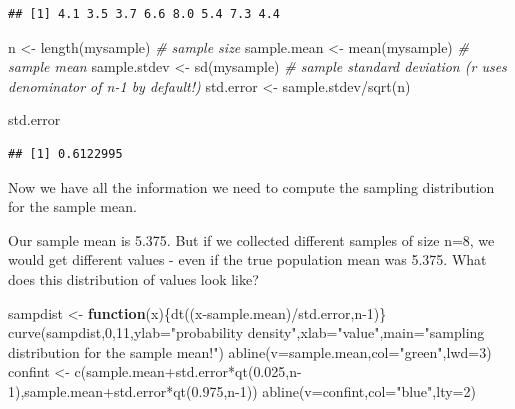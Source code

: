 \documentclass[
]{article}
\newenvironment{Shaded}{\begin{snugshade}}{\end{snugshade}}
\newcommand{\AttributeTok}[1]{\textcolor[rgb]{0.77,0.63,0.00}{#1}}
\newcommand{\CommentTok}[1]{\textcolor[rgb]{0.56,0.35,0.01}{\textit{#1}}}
\newcommand{\ControlFlowTok}[1]{\textcolor[rgb]{0.13,0.29,0.53}{\textbf{#1}}}
\newcommand{\DecValTok}[1]{\textcolor[rgb]{0.00,0.00,0.81}{#1}}
\newcommand{\FloatTok}[1]{\textcolor[rgb]{0.00,0.00,0.81}{#1}}
\newcommand{\FunctionTok}[1]{\textcolor[rgb]{0.00,0.00,0.00}{#1}}
\newcommand{\NormalTok}[1]{#1}
\newcommand{\OtherTok}[1]{\textcolor[rgb]{0.56,0.35,0.01}{#1}}
\newcommand{\SpecialCharTok}[1]{\textcolor[rgb]{0.00,0.00,0.00}{#1}}
\newcommand{\StringTok}[1]{\textcolor[rgb]{0.31,0.60,0.02}{#1}}
\begin{document}
\begin{verbatim}
## [1] 4.1 3.5 3.7 6.6 8.0 5.4 7.3 4.4
\end{verbatim}

\begin{Shaded}
\begin{Highlighting}[]
\NormalTok{n }\OtherTok{\textless{}{-}} \FunctionTok{length}\NormalTok{(mysample)    }\CommentTok{\# sample size}
\NormalTok{sample.mean }\OtherTok{\textless{}{-}} \FunctionTok{mean}\NormalTok{(mysample)  }\CommentTok{\# sample mean}
\NormalTok{sample.stdev }\OtherTok{\textless{}{-}} \FunctionTok{sd}\NormalTok{(mysample)   }\CommentTok{\# sample standard deviation (r uses denominator of n{-}1 by default!)}
\NormalTok{std.error }\OtherTok{\textless{}{-}}\NormalTok{ sample.stdev}\SpecialCharTok{/}\FunctionTok{sqrt}\NormalTok{(n) }

\NormalTok{std.error }
\end{Highlighting}
\end{Shaded}

\begin{verbatim}
## [1] 0.6122995
\end{verbatim}

Now we have all the information we need to compute the sampling
distribution for the sample mean.

Our sample mean is 5.375. But if we collected different samples of size
n=8, we would get different values - even if the true population mean
was 5.375. What does this distribution of values look like?

\begin{Shaded}
\begin{Highlighting}[]
\NormalTok{sampdist }\OtherTok{\textless{}{-}} \ControlFlowTok{function}\NormalTok{(x)\{}\FunctionTok{dt}\NormalTok{((x}\SpecialCharTok{{-}}\NormalTok{sample.mean)}\SpecialCharTok{/}\NormalTok{std.error,n}\DecValTok{{-}1}\NormalTok{)\}}
\FunctionTok{curve}\NormalTok{(sampdist,}\DecValTok{0}\NormalTok{,}\DecValTok{11}\NormalTok{,}\AttributeTok{ylab=}\StringTok{"probability density"}\NormalTok{,}\AttributeTok{xlab=}\StringTok{"value"}\NormalTok{,}\AttributeTok{main=}\StringTok{"sampling distribution for the sample mean!"}\NormalTok{)}
\FunctionTok{abline}\NormalTok{(}\AttributeTok{v=}\NormalTok{sample.mean,}\AttributeTok{col=}\StringTok{"green"}\NormalTok{,}\AttributeTok{lwd=}\DecValTok{3}\NormalTok{)}
\NormalTok{confint }\OtherTok{\textless{}{-}} \FunctionTok{c}\NormalTok{(sample.mean}\SpecialCharTok{+}\NormalTok{std.error}\SpecialCharTok{*}\FunctionTok{qt}\NormalTok{(}\FloatTok{0.025}\NormalTok{,n}\DecValTok{{-}1}\NormalTok{),sample.mean}\SpecialCharTok{+}\NormalTok{std.error}\SpecialCharTok{*}\FunctionTok{qt}\NormalTok{(}\FloatTok{0.975}\NormalTok{,n}\DecValTok{{-}1}\NormalTok{))}
\FunctionTok{abline}\NormalTok{(}\AttributeTok{v=}\NormalTok{confint,}\AttributeTok{col=}\StringTok{"blue"}\NormalTok{,}\AttributeTok{lty=}\DecValTok{2}\NormalTok{)}
\end{Highlighting}
\end{Shaded}
\end{document}
